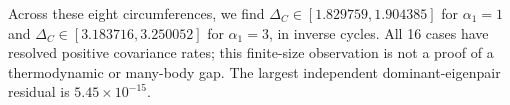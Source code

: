 Across these eight circumferences, we find $\Delta_C\in[1.829759,1.904385]$ for $\alpha_1=1$ and $\Delta_C\in[3.183716,3.250052]$ for $\alpha_1=3$, in inverse cycles. All 16 cases have resolved positive covariance rates; this finite-size observation is not a proof of a thermodynamic or many-body gap. The largest independent dominant-eigenpair residual is $5.45\times10^{-15}$.
